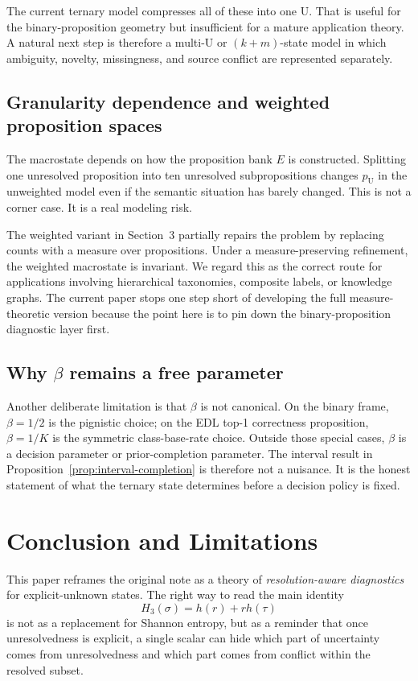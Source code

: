 \documentclass[11pt]{article}
\newcommand{\U}{\mathrm{U}}
\newcommand{\1}{\mathbf{1}}
\newcommand{\hbin}{h}
\begin{document}
The current ternary model compresses all of these into one $\U$. That is useful for the binary-proposition geometry but insufficient for a mature application theory. A natural next step is therefore a multi-$\U$ or $(k+m)$-state model in which ambiguity, novelty, missingness, and source conflict are represented separately.

\subsection{Granularity dependence and weighted proposition spaces}
\label{sec:discussion-weighted}

The macrostate depends on how the proposition bank $E$ is constructed. Splitting one unresolved proposition into ten unresolved subpropositions changes $p_\U$ in the unweighted model even if the semantic situation has barely changed. This is not a corner case. It is a real modeling risk.

The weighted variant in Section~3 partially repairs the problem by replacing counts with a measure over propositions. Under a measure-preserving refinement, the weighted macrostate is invariant. We regard this as the correct route for applications involving hierarchical taxonomies, composite labels, or knowledge graphs. The current paper stops one step short of developing the full measure-theoretic version because the point here is to pin down the binary-proposition diagnostic layer first.

\subsection{Why $\beta$ remains a free parameter}

Another deliberate limitation is that $\beta$ is not canonical. On the binary frame, $\beta=1/2$ is the pignistic choice; on the EDL top-1 correctness proposition, $\beta=1/K$ is the symmetric class-base-rate choice. Outside those special cases, $\beta$ is a decision parameter or prior-completion parameter. The interval result in Proposition~\ref{prop:interval-completion} is therefore not a nuisance. It is the honest statement of what the ternary state determines before a decision policy is fixed.

\section{Conclusion and Limitations}

This paper reframes the original note as a theory of \emph{resolution-aware diagnostics} for explicit-unknown states. The right way to read the main identity
\[
H_3(\sigma)=\hbin(r)+r\hbin(\tau)
\]
is not as a replacement for Shannon entropy, but as a reminder that once unresolvedness is explicit, a single scalar can hide which part of uncertainty comes from unresolvedness and which part comes from conflict within the resolved subset.
\end{document}
